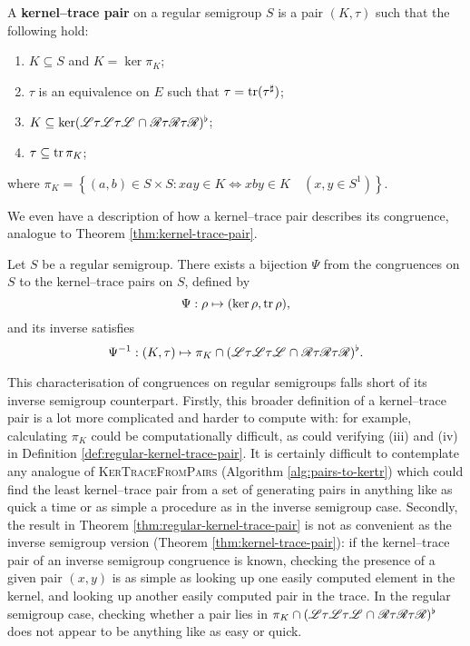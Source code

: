 \begin{definition}
  \label{def:regular-kernel-trace-pair}
  A \textbf{kernel--trace pair} on a regular semigroup $S$ is a pair $(K,\tau)$
  such that the following hold:
  \begin{enumerate}[\rm(i)]
  \item $K \subseteq S$ and $K = \ker \pi_K$;
  \item $\tau$ is an equivalence on $E$ such that $\tau = \operatorname{tr}(\tau^\sharp)$;
  \item
    $K \subseteq \ker(\mathrel{\mathscr{L}}\mathrel{\tau}\mathrel{\mathscr{L}}\mathrel{\tau}\mathrel{\mathscr{L}} \cap
    \mathrel{\mathscr{R}}\mathrel{\tau}\mathrel{\mathscr{R}}\mathrel{\tau}\mathrel{\mathscr{R}})^\flat$;
  \item $\tau \subseteq \operatorname{tr} \pi_K$;
  \end{enumerate}
  where
  $\pi_K = \left\{(a,b) \in S \times S : xay \in K \Leftrightarrow xby \in K
    \quad (x,y \in S^1)\right\}$.
\end{definition}

We even have a description of how a kernel--trace pair describes its congruence,
analogue to Theorem \ref{thm:kernel-trace-pair}.

\begin{theorem}
  \label{thm:regular-kernel-trace-pair}
  Let $S$ be a regular semigroup.  There exists a bijection $\Psi$ from the
  congruences on $S$ to the kernel--trace pairs on $S$, defined by
  $$\Psi: \rho \mapsto (\ker\rho, \operatorname{tr}\rho),$$
  and its inverse satisfies
  $$\Psi^{-1} : (K,\tau) \mapsto \pi_K \cap
  (\mathrel{\mathscr{L}}\mathrel{\tau}\mathrel{\mathscr{L}}\mathrel{\tau}\mathrel{\mathscr{L}} \cap
  \mathrel{\mathscr{R}}\mathrel{\tau}\mathrel{\mathscr{R}}\mathrel{\tau}\mathrel{\mathscr{R}})^\flat.$$
\end{theorem}

This characterisation of congruences on regular semigroups falls short of its
inverse semigroup counterpart.  Firstly, this broader definition of a
kernel--trace pair is a lot more complicated and harder to compute with: for
example, calculating $\pi_K$ could be computationally difficult, as could
verifying (iii) and (iv) in Definition \ref{def:regular-kernel-trace-pair}.  It is
certainly difficult to contemplate any analogue of \textsc{KerTraceFromPairs}
(Algorithm \ref{alg:pairs-to-kertr}) which could find the least kernel--trace
pair from a set of generating pairs in anything like as quick a time or as
simple a procedure as in the inverse semigroup case.  Secondly, the result in
Theorem \ref{thm:regular-kernel-trace-pair} is not as convenient as the inverse
semigroup version (Theorem \ref{thm:kernel-trace-pair}): if the kernel--trace
pair of an inverse semigroup congruence is known, checking the presence of a
given pair $(x,y)$ is as simple as looking up one easily computed element in the
kernel, and looking up another easily computed pair in the trace.  In the
regular semigroup case, checking whether a pair lies in
$\pi_K \cap (\mathrel{\mathscr{L}}\mathrel{\tau}\mathrel{\mathscr{L}}\mathrel{\tau}\mathrel{\mathscr{L}} \cap
\mathrel{\mathscr{R}}\mathrel{\tau}\mathrel{\mathscr{R}}\mathrel{\tau}\mathrel{\mathscr{R}})^\flat$ does not appear to be anything
like as easy or quick.

